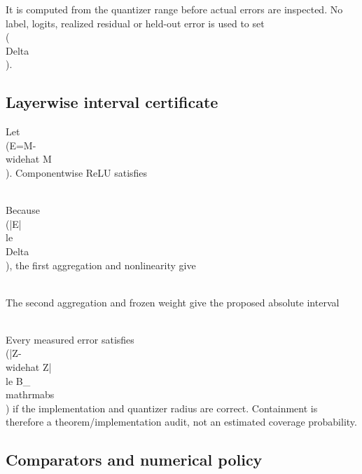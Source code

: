 \documentclass{article}
\begin{document}
It is computed from the quantizer range before actual errors are inspected. No label, logits, realized residual or held-out error is used to set \\(\\Delta\\).

\subsection{Layerwise interval certificate}

\label{sec:layerwise\_interval\_certificate}

Let \\(E=M-\\widehat M\\). Componentwise ReLU satisfies

\\[
|\\operatorname{relu}(x)-\\operatorname{relu}(y)|\\le |x-y|.
\\]

Because \\(|E|\\le\\Delta\\), the first aggregation and nonlinearity give

\\[
|H-\\widehat H|\\le |A|\\Delta.
\\]

The second aggregation and frozen weight give the proposed absolute interval

\\[
B\_\{\\mathrm{abs}\}=|A||A|\\Delta|W\_1|.
\\]

Every measured error satisfies \\(|Z-\\widehat Z|\\le B_{\\mathrm{abs}}\\) if the implementation and quantizer radius are correct. Containment is therefore a theorem/implementation audit, not an estimated coverage probability.

\subsection{Comparators and numerical policy}
\end{document}

